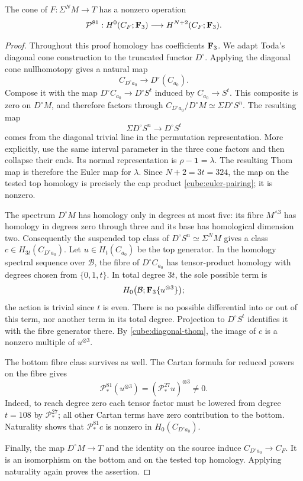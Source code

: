 \begin{proposition}\label{cube:primary-detection}
The cone of \(F:\Sigma^NM\to T\) has a nonzero operation
\[
 \mathcal P^{81}:H^0(C_F;\mathbf F_3)\longrightarrow
 H^{N+2}(C_F;\mathbf F_3).
\]
\end{proposition}

\begin{proof}
Throughout this proof homology has coefficients \(\mathbf F_3\).
We adapt Toda's diagonal cone construction
\cite[Section~1, Theorem~2]{TodaExtended} to the truncated functor
\(D^\circ\). Applying the diagonal cone nullhomotopy gives a natural map
\[
 C_{D^\circ a_0}\longrightarrow D^\circ(C_{a_0}).
\]
Compose it with the map \(D^\circ C_{a_0}\to D^\circ S^t\)
induced by \(C_{a_0}\to S^t\).  This composite is zero on
\(D^\circ M\), and therefore factors through
\(C_{D^\circ a_0}/D^\circ M\simeq\Sigma D^\circ S^n\).
The resulting map
\begin{equation}\label{cube:diagonal-thom}
 \Sigma D^\circ S^n\longrightarrow D^\circ S^t
\end{equation}
comes from the diagonal trivial line in the permutation
representation.  More explicitly, use the same interval
parameter in the three cone factors and then collapse
their ends.  Its normal representation is
\(\rho-\mathbf1=\lambda\).  The resulting Thom map is
therefore the Euler map for \(\lambda\).
Since \(N+2=3t=324\), the map on the tested top homology
is precisely the cap product \eqref{cube:euler-pairing};
it is nonzero.

The spectrum \(D^\circ M\) has homology only in degrees
at most five: its fibre \(M^{\wedge3}\) has homology in
degrees zero through three and its base has homological
dimension two.  Consequently the suspended top class
of \(D^\circ S^n\simeq\Sigma^NM\) gives a class
\(c\in H_{3t}(C_{D^\circ a_0})\).
Let \(u\in H_t(C_{a_0})\) be the top generator.
In the homology spectral sequence over \(\mathcal B\),
the fibre of \(D^\circ C_{a_0}\) has tensor-product
homology with degrees chosen from \(\{0,1,t\}\).
In total degree \(3t\), the sole possible term is
\[
 H_0\bigl(\mathcal B;\mathbf F_3\{u^{\otimes3}\}\bigr);
\]
the action is trivial since \(t\) is even.
There is no possible differential into or out of this
term, nor another term in its total degree.
Projection to \(D^\circ S^t\) identifies it with the
fibre generator there.  By \eqref{cube:diagonal-thom},
the image of \(c\) is a nonzero multiple of
\(u^{\otimes3}\).

The bottom fibre class survives as well.  The Cartan formula
for reduced powers \cite[Section~2, Property~2.5]{Milnor} on the
fibre gives
\[
 \mathcal P_*^{81}(u^{\otimes3})
       =(\mathcal P_*^{27}u)^{\otimes3}\ne0.
\]
Indeed, to reach degree zero each tensor factor must
be lowered from degree \(t=108\) by \(\mathcal P_*^{27}\);
all other Cartan terms have zero contribution to the
bottom.  Naturality shows that
\(\mathcal P_*^{81}c\) is nonzero in
\(H_0(C_{D^\circ a_0})\).

Finally, the map \(D^\circ M\to T\) and the identity on
the source induce \(C_{D^\circ a_0}\to C_F\).
It is an isomorphism on the bottom and on the tested top
homology.  Applying naturality again proves the assertion.
\end{proof}

